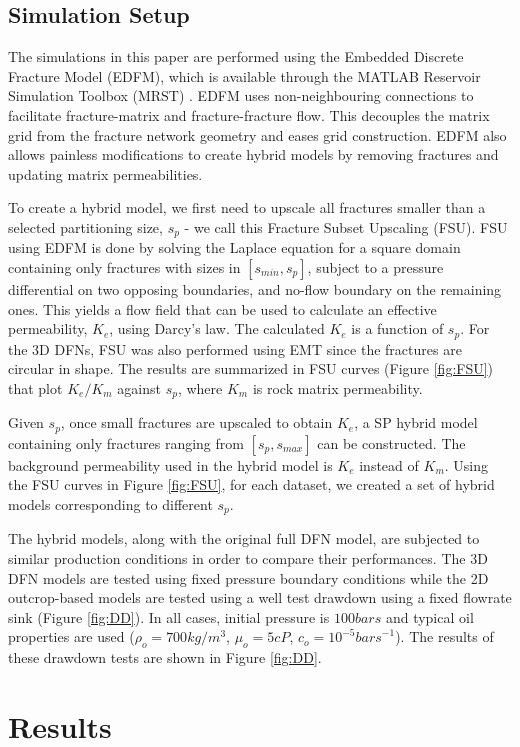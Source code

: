 \documentclass[a4paper]{article}
\begin{document}
\subsection{Simulation Setup}
The simulations in this paper are performed using the Embedded Discrete Fracture Model (EDFM), which is available through the MATLAB Reservoir Simulation Toolbox (MRST) \citep{Lee2001, Lie2015, Moinfar2013}. EDFM uses non-neighbouring connections to facilitate fracture-matrix and fracture-fracture flow. This decouples the matrix grid from the fracture network geometry and eases grid construction. EDFM also allows painless modifications to create hybrid models by removing fractures and updating matrix permeabilities.

To create a hybrid model, we first need to upscale all fractures smaller than a selected partitioning size, $s_p$ - we call this Fracture Subset Upscaling (FSU). FSU using EDFM is done by solving the Laplace equation for a square domain containing only fractures with sizes in $[s_{min},s_p]$, subject to a pressure differential on two opposing boundaries, and no-flow boundary on the remaining ones. This yields a flow field that can be used to calculate an effective permeability, $K_{e}$, using Darcy's law. The calculated $K_{e}$ is a function of $s_p$. For the 3D DFNs, FSU was also performed using EMT since the fractures are circular in shape. The results are summarized in FSU curves (Figure \ref{fig:FSU}) that plot $K_{e}/K_m$ against $s_p$, where $K_m$ is rock matrix permeability.

Given $s_p$, once small fractures are upscaled to obtain $K_e$, a SP hybrid model containing only fractures ranging from $[s_p,s_{max}]$ can be constructed. The background permeability used in the hybrid model is $K_e$ instead of $K_m$. Using the FSU curves in Figure \ref{fig:FSU}, for each dataset, we created a set of hybrid models corresponding to different $s_p$. 

The hybrid models, along with the original full DFN model, are subjected to similar production conditions in order to compare their performances. The 3D DFN models are tested using fixed pressure boundary conditions while the 2D outcrop-based models are tested using a well test drawdown using a fixed flowrate sink (Figure \ref{fig:DD}). In all cases, initial pressure is $100 bars$ and typical oil properties are used ($\rho_o=700 kg/m^3$, $\mu_o=5 cP$, $c_o=10^{-5} {bars}^{-1}$). The results of these drawdown tests are shown in Figure \ref{fig:DD}.

\section{Results}
\end{document}
